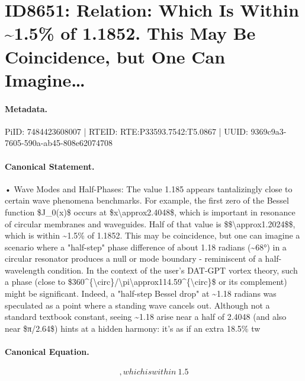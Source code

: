 \section*{ID8651: Relation: Which Is Within \textasciitilde{}1.5\% of 1.1852. This May Be Coincidence, but One Can Imagine…}
\paragraph{Metadata.}
PiID: 7484423608007 | RTEID: RTE:P33593.7542:T5.0867 | UUID: 9369c9a3-7605-590a-ab45-808e62074708

\paragraph{Canonical Statement.}
• Wave Modes and Half-Phases: The value 1.185 appears tantalizingly close to certain wave phenomena benchmarks. For example, the first zero of the Bessel function \$J\_0(x)\$ occurs at \$x\textbackslash{}approx2.4048\$, which is important in resonance of circular membranes and waveguides. Half of that value is \$\$\textbackslash{}approx1.2024\$\$, which is within \textasciitilde{}1.5\% of 1.1852. This may be coincidence, but one can imagine a scenario where a "half-step" phase difference of about 1.18 radians (\textasciitilde{}68°) in a circular resonator produces a null or mode boundary - reminiscent of a half-wavelength condition. In the context of the user's DAT-GPT vortex theory, such a phase (close to \$360\textasciicircum{}\{\textbackslash{}circ\}/\textbackslash{}pi\textbackslash{}approx114.59\textasciicircum{}\{\textbackslash{}circ\}\$ or its complement) might be significant. Indeed, a "half-step Bessel drop" at \textasciitilde{}1.18 radians was speculated as a point where a standing wave cancels out. Although not a standard textbook constant, seeing \textasciitilde{}1.18 arise near a half of 2.4048 (and also near \$π/2.64\$) hints at a hidden harmony: it's as if an extra 18.5\% tw

\paragraph{Canonical Equation.}
\[
, which is within ~1.5%
\]

